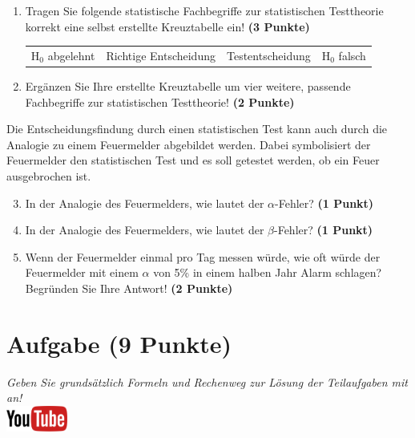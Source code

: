 \documentclass[a4paper, 9pt]{scrartcl}\usepackage[]{graphicx}\usepackage[]{xcolor}
\begin{document}
\begin{enumerate}
\item Tragen Sie folgende statistische Fachbegriffe zur statistischen
  Testtheorie korrekt eine selbst erstellte Kreuztabelle ein! \textbf{(3
    Punkte)}
  \begin{center}
  \begin{tabular}{cccc}
  H$_0$ abgelehnt & Richtige Entscheidung & Testentscheidung & H$_0$ falsch \\
  \end{tabular}
  \end{center}
\item Erg{\"a}nzen Sie Ihre erstellte Kreuztabelle um vier weitere, passende
  Fachbegriffe zur statistischen Testtheorie! \textbf{(2 Punkte)}
\end{enumerate}

Die Entscheidungsfindung durch einen statistischen Test kann auch durch die
Analogie zu einem Feuermelder abgebildet werden. Dabei symbolisiert der
Feuermelder den statistischen Test und es soll getestet werden, ob ein Feuer
ausgebrochen ist.

\begin{enumerate}
  \setcounter{enumi}{2}    
\item In der Analogie des Feuermelders, wie lautet der $\alpha$-Fehler? \textbf{(1 Punkt)}
\item In der Analogie des Feuermelders, wie lautet der $\beta$-Fehler? \textbf{(1 Punkt)}
\item Wenn der Feuermelder einmal pro Tag messen w{\"u}rde, wie oft w{\"u}rde der
  Feuermelder mit einem $\alpha$ von 5\% in einem halben Jahr Alarm schlagen?
  Begr{\"u}nden Sie Ihre Antwort! \textbf{(2 Punkte)}
\end{enumerate}



 
\clearpage

\section{Aufgabe \hfill (9 Punkte)}

\textit{Geben Sie grunds{\"a}tzlich Formeln und Rechenweg zur L{\"o}sung der
  Teilaufgaben mit an!} \\[1Ex]

\hfill\href{https://youtu.be/32JjH1eyuTU}{\includegraphics[width =
  2cm]{img/youtube}}\\[1Ex]
\end{document}
